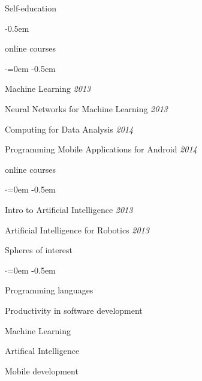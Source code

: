 \documentclass{resume} %
\begin{document}
\begin{rSection}{Self-education}

\begin{description} \itemsep -0.5em \vspace{-0.5em}
  \item[Coursera] \hfill {online courses}
  \begin{list}{$\cdot$}{\leftmargin=0em} %
    \itemsep -0.5em \vspace{-0.5em} %
    \item Machine Learning \hfill {\em 2013}
    \item Neural Networks for Machine Learning \hfill {\em  2013}
    \item Computing for Data Analysis \hfill {\em  2014}
    \item Programming Mobile Applications for Android \hfill {\em  2014}
  \end{list}
  \item[Udacity] \hfill {online courses}
  \begin{list}{$\cdot$}{\leftmargin=0em} %
    \itemsep -0.5em \vspace{-0.5em} %
    \item Intro to Artificial Intelligence \hfill {\em  2013}
    \item Artificial Intelligence for Robotics \hfill {\em  2013}
  \end{list}
\end{description}

\end{rSection}


\begin{rSection}{Spheres of interest}
  \smallskip
  \begin{list}{$\cdot$}{\leftmargin=0em} %
    \itemsep -0.5em \vspace{-0.5em} %
  \item Programming languages
  \item Productivity in software development
  \item Machine Learning
  \item Artifical Intelligence
  \item Mobile development
  \end{list}
\end{rSection}
\end{document}

